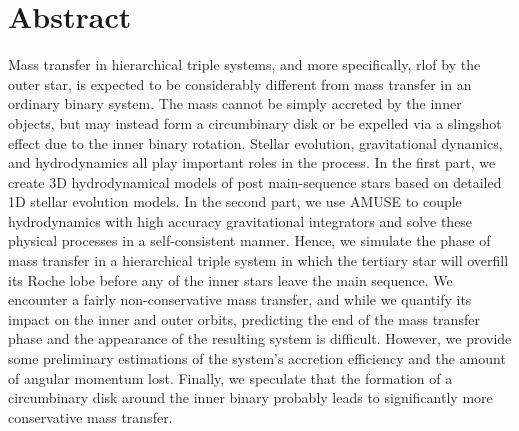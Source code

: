 \chapter*{Abstract}

Mass transfer in hierarchical triple systems, and more specifically, \ac{rlof} by the outer star, is expected to be considerably different from mass transfer in an ordinary binary system. The mass cannot be simply accreted by the inner objects, but may instead form a circumbinary disk or be expelled via a slingshot effect due to the inner binary rotation. Stellar evolution, gravitational dynamics, and hydrodynamics all play important roles in the process. In the first part, we create 3D hydrodynamical models of post main-sequence stars based on detailed 1D stellar evolution models. In the second part, we use AMUSE to couple hydrodynamics with high accuracy gravitational integrators and solve these physical processes in a self-consistent  manner. Hence, we simulate the phase of mass transfer in a hierarchical triple system in which the tertiary star will overfill its Roche lobe before any of the inner stars leave the main sequence. We encounter a fairly non-conservative mass transfer, and while we quantify its impact on the inner and outer orbits, predicting the end of the mass transfer phase and the appearance of the resulting system is difficult. However, we provide some preliminary estimations of the system's accretion efficiency and the amount of angular momentum lost. Finally,
we speculate that the formation of a circumbinary disk around the inner binary probably leads to significantly more conservative mass transfer. 




